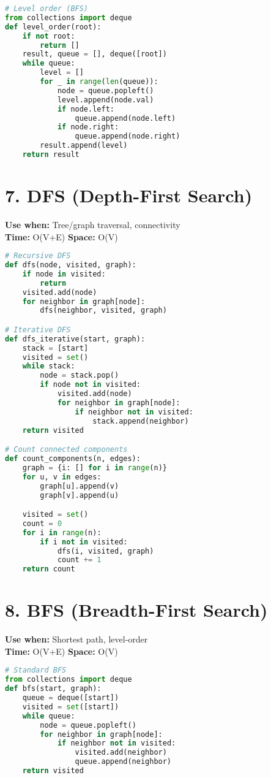 \documentclass[8pt,landscape]{article}
\begin{document}
\begin{multicols}{3}
\begin{lstlisting}[language=Python]
# Level order (BFS)
from collections import deque
def level_order(root):
    if not root:
        return []
    result, queue = [], deque([root])
    while queue:
        level = []
        for _ in range(len(queue)):
            node = queue.popleft()
            level.append(node.val)
            if node.left:
                queue.append(node.left)
            if node.right:
                queue.append(node.right)
        result.append(level)
    return result
\end{lstlisting}

\section*{7. DFS (Depth-First Search)}
\textbf{Use when:} Tree/graph traversal, connectivity \\
\textbf{Time:} O(V+E) \quad \textbf{Space:} O(V)
\begin{lstlisting}[language=Python]
# Recursive DFS
def dfs(node, visited, graph):
    if node in visited:
        return
    visited.add(node)
    for neighbor in graph[node]:
        dfs(neighbor, visited, graph)

# Iterative DFS
def dfs_iterative(start, graph):
    stack = [start]
    visited = set()
    while stack:
        node = stack.pop()
        if node not in visited:
            visited.add(node)
            for neighbor in graph[node]:
                if neighbor not in visited:
                    stack.append(neighbor)
    return visited

# Count connected components
def count_components(n, edges):
    graph = {i: [] for i in range(n)}
    for u, v in edges:
        graph[u].append(v)
        graph[v].append(u)

    visited = set()
    count = 0
    for i in range(n):
        if i not in visited:
            dfs(i, visited, graph)
            count += 1
    return count
\end{lstlisting}

\section*{8. BFS (Breadth-First Search)}
\textbf{Use when:} Shortest path, level-order \\
\textbf{Time:} O(V+E) \quad \textbf{Space:} O(V)
\begin{lstlisting}[language=Python]
# Standard BFS
from collections import deque
def bfs(start, graph):
    queue = deque([start])
    visited = set([start])
    while queue:
        node = queue.popleft()
        for neighbor in graph[node]:
            if neighbor not in visited:
                visited.add(neighbor)
                queue.append(neighbor)
    return visited


\end{lstlisting}
\end{multicols}
\end{document}
